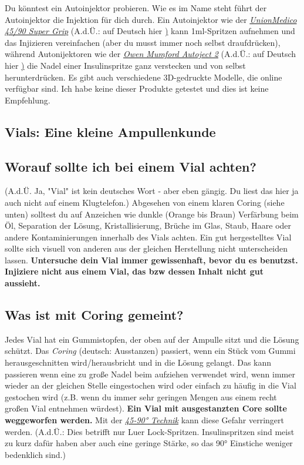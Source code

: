 \documentclass{article}
\begin{document}
Du könntest ein Autoinjektor probieren. Wie es im Name steht führt der Autoinjektor die Injektion für dich durch. Ein Autoinjektor wie der \href{https://unionmedico.com/90-super-grip/}{\textit{UnionMedico 45/90 Super Grip}} (A.d.Ü.: auf Deutsch hier \href{https://www.b12-injektion.de/}) kann 1ml-Spritzen aufnehmen und das Injizieren vereinfachen (aber du musst immer noch selbst draufdrücken), während Autonijektoren wie der \href{https://www.owenmumford.com/us/medical-devices/autoject-2}{\textit{Owen Mumford Autoject 2}} (A.d.Ü.: auf Deutsch hier \href{https://shop.owen-mumford.de/Sonstiges/Autoinjektor-Autoject-2-mit-austauschbarer-Nadel.html}) die Nadel einer Insulinspritze ganz verstecken und von selbst herunterdrücken. Es gibt auch verschiedene 3D-gedruckte Modelle, die online verfügbar sind. Ich habe keine dieser Produkte getestet und dies ist keine Empfehlung.

\subsection*{Vials: Eine kleine Ampullenkunde}

\subsection{Worauf sollte ich bei einem Vial achten?}

(A.d.Ü. Ja, "Vial" ist kein deutsches Wort - aber eben gängig. Du liest das hier ja auch nicht auf einem Klugtelefon.) Abgesehen von einem klaren Coring (siehe unten) solltest du auf Anzeichen wie dunkle (Orange bis Braun) Verfärbung beim Öl, Separation der Lösung, Kristallisierung, Brüche im Glas, Staub, Haare oder andere Kontaminierungen innerhalb des Vials achten. Ein gut hergestelltes Vial sollte sich visuell von anderen aus der gleichen Herstellung nicht unterscheiden lassen. \textbf{Untersuche dein Vial immer gewissenhaft, bevor du es benutzst. Injiziere nicht aus einem Vial, das bzw dessen Inhalt nicht gut aussieht.}

\subsection{Was ist mit Coring gemeint?}\label{5-23}

Jedes Vial hat ein Gummistopfen, der oben auf der Ampulle sitzt und die Lösung schützt. Das \textit{Coring} (deutsch: Ausstanzen) passiert, wenn ein Stück vom Gummi herausgeschnitten wird/herausbricht und in die Lösung gelangt. Das kann passieren wenn eine zu große Nadel beim aufziehen verwendet wird, wenn immer wieder an der gleichen Stelle eingestochen wird oder einfach zu häufig in die Vial gestochen wird (z.B. wenn du immer sehr geringen Mengen aus einem recht großen Vial entnehmen würdest). \textbf{Ein Vial mit ausgestanzten Core sollte weggeworfen werden. }Mit der \href{https://www.youtube.com/watch?v=w5F0SLoMjC8}{\textit{45-90° Technik}} kann diese Gefahr verringert werden. (A.d.Ü.: Dies betrifft nur Luer Lock-Spritzen. Insulinspritzen sind meist zu kurz dafür haben aber auch eine geringe Stärke, so das 90° Einstiche weniger bedenklich sind.)
\end{document}
